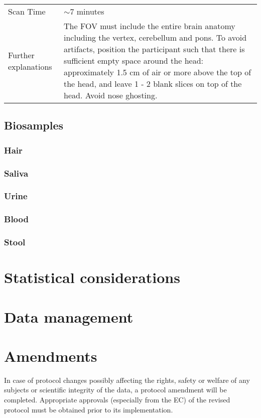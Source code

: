 \documentclass[
	a4paper, 
	11.5pt,
	headings=small, 
	twoside, 
	titlepage=firstiscover, 
 	pagesize=auto,
  	version=last,
	open=any,
	BCOR=14mm,
  	chapterprefix=false]{scrbook}
\begin{document}
\begin{table}[H]
\begin{tabularx}{1\textwidth}{@{}X *{1}{X}@{}}
Scan Time                 								& $\sim$7 minutes                                                                           \\
Further explanations      						&  The FOV must include the entire brain anatomy including the vertex, cerebellum and pons. To avoid artifacts, position the participant such that there is sufficient empty space around the head: approximately 1.5 cm of air or more above the top of the head, and leave 1 - 2 blank slices on top of the head. Avoid nose ghosting.                                                                                        
\end{tabularx}
\end{table}

\subsection{Biosamples}
\subsubsection{Hair}
\subsubsection{Saliva}
\subsubsection{Urine}
\subsubsection{Blood}
\subsubsection{Stool}

\section{Statistical considerations}

\section{Data management}

\section{Amendments}
In case of protocol changes possibly affecting the rights, safety or welfare of any subjects or scientific integrity of the data, a protocol amendment will be completed. Appropriate approvals (especially from the \ac{EC}) of the revised protocol must be obtained prior to its implementation.
\end{document}
